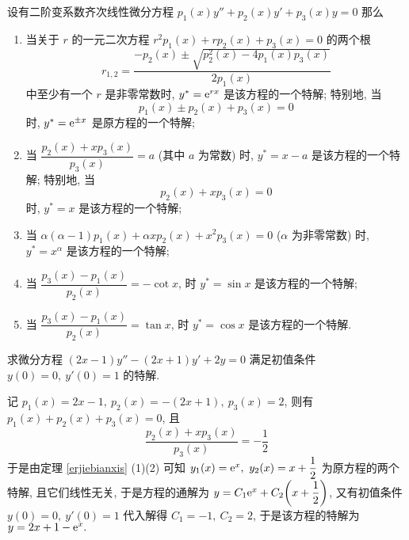 \begin{theorem}
    设有二阶变系数齐次线性微分方程 $p_1(x)y''+p_2(x)y'+p_3(x)y=0$ 那么 \label{erjiebianxis}
    \begin{enumerate}[label=(\arabic{*})]
        \item 当关于 $r$ 的一元二次方程 $r^2p_1(x)+rp_2(x)+p_3(x)=0$ 的两个根
              $$r_{1,2}=\dfrac{-p_2(x)\pm\sqrt{p_2^2(x)-4p_1(x)p_3(x)}}{2p_1(x)}$$
              中至少有一个 $r$ 是非零常数时, $y^*=\mathrm{e} ^{rx}$ 是该方程的一个特解;
              特别地, 当 $$p_1(x)\pm p_2(x)+p_3(x)=0$$
              时, $y^*=\mathrm{e} ^{\pm x}$ 是原方程的一个特解;
        \item 当 $\dfrac{p_2(x)+xp_3(x)}{p_3(x)}=a$ (其中 $a$ 为常数) 时,
              $y^*=x-a$ 是该方程的一个特解; 特别地, 当 $$p_2(x)+xp_3(x)=0$$ 时,
              $y^*=x$ 是该方程的一个特解;
        \item 当 $\alpha(\alpha-1)p_1(x)+\alpha xp_2(x)+x^2p_3(x)=0$ ($\alpha$ 为非零常数) 时,
              $y^*=x^\alpha$ 是该方程的一个特解;
        \item 当 $\dfrac{p_3(x)-p_1(x)}{p_2(x)}=-\cot x$, 时 $y^*=\sin x$ 是该方程的一个特解;
        \item 当 $\dfrac{p_3(x)-p_1(x)}{p_2(x)}=\tan x$, 时 $y^*=\cos x$ 是该方程的一个特解.
    \end{enumerate}
\end{theorem}

\begin{example}
    求微分方程 $(2x-1)y''-(2x+1)y'+2y=0$ 满足初值条件 $y(0)=0,~y'(0)=1$ 的特解.
\end{example}
\begin{solution}
    记 $p_1(x)=2x-1,~p_2(x)=-(2x+1),~p_3(x)=2$, 则有 $p_1(x)+p_2(x)+p_3(x)=0$, 且
    $$\dfrac{p_2(x)+xp_3(x)}{p_3(x)}=-\dfrac{1}{2}$$
    于是由定理 \ref{erjiebianxis} (1)(2) 可知 $y_1(x)=\mathrm{e} ^x,~y_2(x)=x+\dfrac{1}{2}$ 为原方程的两个特解,
    且它们线性无关, 于是方程的通解为 $y=C_1\mathrm{e} ^x+C_2\qty(x+\dfrac{1}{2})$, 又有初值条件 $y(0)=0,~y'(0)=1$ 代入解得
    $C_1=-1,~C_2=2$, 于是该方程的特解为 $y=2x+1-\mathrm{e} ^x.$
\end{solution}

